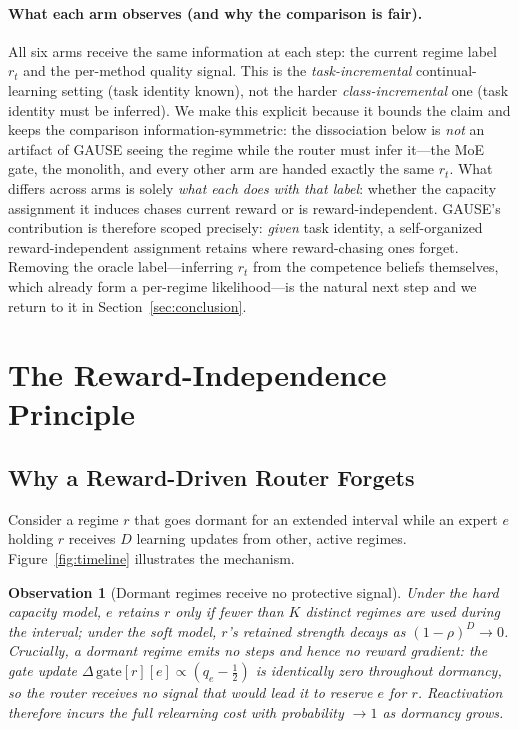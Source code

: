 \documentclass[10pt]{article}
\newtheorem{observation}{Observation}
\begin{document}
\paragraph{What each arm observes (and why the comparison is fair).} All six
arms receive the same information at each step: the current regime label $r_t$
and the per-method quality signal. This is the \emph{task-incremental} continual-learning
setting (task identity known), not the harder \emph{class-incremental} one (task
identity must be inferred). We make this explicit because it bounds the claim and
keeps the comparison information-symmetric: the dissociation below is \emph{not} an
artifact of GAUSE seeing the regime while the router must infer it---the MoE gate,
the monolith, and every other arm are handed exactly the same $r_t$. What differs
across arms is solely \emph{what each does with that label}: whether the
capacity assignment it induces chases current reward or is reward-independent.
GAUSE's contribution is therefore scoped precisely: \emph{given} task identity, a
self-organized reward-independent assignment retains where reward-chasing ones
forget. Removing the oracle label---inferring $r_t$ from the competence beliefs
themselves, which already form a per-regime likelihood---is the natural next step
and we return to it in Section~\ref{sec:conclusion}.

\section{The Reward-Independence Principle}
\label{sec:principle}

\subsection{Why a Reward-Driven Router Forgets}

Consider a regime $r$ that goes dormant for an extended interval while an expert
$e$ holding $r$ receives $D$ learning updates from other, active regimes.
Figure~\ref{fig:timeline} illustrates the mechanism.

\begin{observation}[Dormant regimes receive no protective signal]
\label{obs}
Under the hard capacity model, $e$ retains $r$ only if fewer than $K$ distinct
regimes are used during the interval; under the soft model, $r$'s retained
strength decays as $(1-\rho)^D \to 0$. Crucially, a dormant regime emits no
steps and hence no reward gradient: the gate update
$\Delta\,\mathrm{gate}[r][e] \propto (q_e - \tfrac12)$ is identically zero
throughout dormancy, so the router receives no signal that would lead it to
reserve $e$ for $r$. Reactivation therefore incurs the full relearning cost with
probability $\to 1$ as dormancy grows.
\end{observation}
\end{document}
